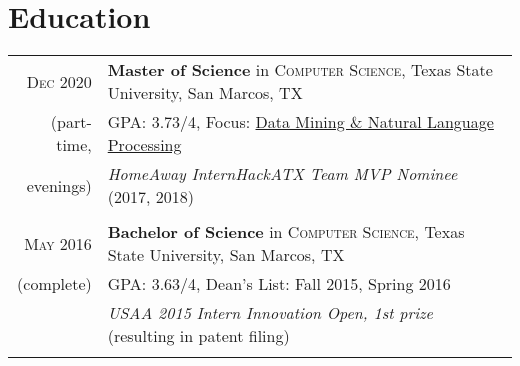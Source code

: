 \documentclass[a4paper,10pt]{article}
\begin{document}
\section{Education}
\begin{tabular}{rl}	
	\textsc{Dec} 2020 & \textbf{Master of Science} in \textsc{Computer Science}, Texas State University, San Marcos, TX\\
	
	(part-time, &\normalsize \textsc{GPA}: 3.73/4, Focus: \underline{Data Mining \& Natural Language Processing} \\ 
	
	evenings)& \emph{HomeAway InternHackATX Team MVP Nominee} (2017, 2018) \\
	
	& \\
	
	\textsc{May} 2016 & \textbf{Bachelor of Science} in \textsc{Computer Science}, Texas State University, San Marcos, TX \\
	
	(complete) &\normalsize \textsc{GPA}: 3.63/4,  Dean's List: Fall 2015, Spring 2016 \\
	
	& \emph{USAA 2015 Intern Innovation Open, 1st prize} (resulting in patent filing)  \\
	
	& \\
\end{tabular}

\end{document}
